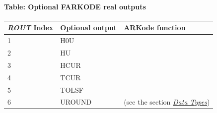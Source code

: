 \documentclass[letterpaper,10pt,english]{sphinxmanual}
\begin{document}
\paragraph{Table: Optional FARKODE real outputs}
\label{f_interface/Optional_output:table-optional-farkode-real-outputs}\label{f_interface/Optional_output:finterface-routtable}
\begin{tabulary}{\linewidth}{|L|L|L|}
\hline
\textbf{\relax 
\emph{ROUT} Index
} & \textbf{\relax 
Optional output
} & \textbf{\relax 
ARKode function
}\\\hline

1
 & 
H0U
 & 
{\hyperref[c_interface/User_callable:ARKodeGetActualInitStep]{}}
\\\hline

2
 & 
HU
 & 
{\hyperref[c_interface/User_callable:ARKodeGetLastStep]{}}
\\\hline

3
 & 
HCUR
 & 
{\hyperref[c_interface/User_callable:ARKodeGetCurrentStep]{}}
\\\hline

4
 & 
TCUR
 & 
{\hyperref[c_interface/User_callable:ARKodeGetCurrentTime]{}}
\\\hline

5
 & 
TOLSF
 & 
{\hyperref[c_interface/User_callable:ARKodeGetTolScaleFactor]{}}
\\\hline

6
 & 
UROUND
 & 
 (see the section {\hyperref[c_interface/General:cinterface-datatypes]{\emph{Data Types}}})
\\\hline
\end{tabulary}
\end{document}
